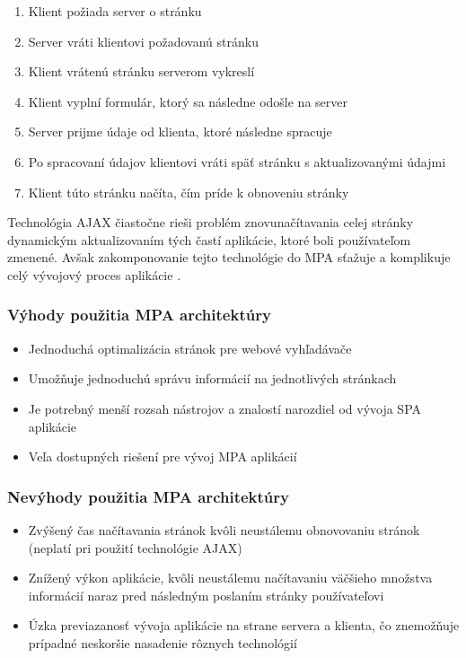 \begin{enumerate}
	\item Klient požiada server o stránku
	\item Server vráti klientovi požadovanú stránku
	\item Klient vrátenú stránku serverom vykreslí
	\item Klient vyplní formulár, ktorý sa následne odošle na server
	\item Server prijme údaje od klienta, ktoré následne spracuje
	\item Po spracovaní údajov klientovi vráti späť stránku s aktualizovanými údajmi
	\item Klient túto stránku načíta, čím príde k obnoveniu stránky
\end{enumerate}

Technológia AJAX čiastočne rieši problém znovunačítavania celej stránky dynamickým aktualizovaním tých častí aplikácie, ktoré boli používateľom zmenené. Avšak zakomponovanie tejto technológie do MPA sťažuje a komplikuje celý vývojový proces aplikácie \cite{mpa-architektura}.

\subsubsection*{Výhody použitia MPA architektúry}

\begin{itemize}
	\item Jednoduchá optimalizácia stránok pre webové vyhľadávače \cite{spa-vs-mpa-1}
	\item Umožňuje jednoduchú správu informácií na jednotlivých stránkach \cite{spa-vs-mpa-3}
	\item Je potrebný menší rozsah nástrojov a znalostí narozdiel od vývoja SPA aplikácie \cite{spa-vs-mpa-2}
	\item Veľa dostupných riešení pre vývoj MPA aplikácií \cite{spa-vs-mpa-2}
\end{itemize}


\subsubsection*{Nevýhody použitia MPA architektúry}

\begin{itemize}
	\item Zvýšený čas načítavania stránok kvôli neustálemu obnovovaniu stránok (neplatí pri použití technológie AJAX) \cite{spa-vs-mpa-1}
	\item Znížený výkon aplikácie, kvôli neustálemu načítavaniu väčšieho množstva informácií naraz pred následným poslaním stránky používateľovi \cite{spa-vs-mpa-1}
	\item Úzka previazanosť vývoja aplikácie na strane servera a klienta, čo znemožňuje prípadné neskoršie nasadenie rôznych technológií \cite{spa-vs-mpa-2}
\end{itemize}


